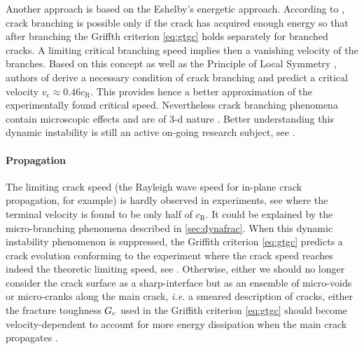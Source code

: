 \begin{itemize}
Another approach is based on the Eshelby's energetic approach. According to \cite{Eshelby:1970}, crack branching is possible only if the crack has acquired enough energy so that after branching the Griffth criterion \eqref{eq:gtgc} holds separately for branched cracks. A limiting critical branching speed implies then a vanishing velocity of the branches. Based on this concept as well as the Principle of Local Symmetry \cite{GolDstein:1974aa}, authors of \cite{KatzavAdda-BediaArias:2007} derive a necessary condition of crack branching and predict a critical velocity $v_\mathrm{c}\approx 0.46c_\mathrm{R}$. This provides hence a better approximation of the experimentally found critical speed. Nevertheless crack branching phenomena contain microscopic effects \cite{Ravi-ChandarKnauss:1984} and are of 3-d nature \cite{FinebergMarder:1999}. Better understanding this dynamic instability is still an active on-going research subject, see \cite{BouchbinderGoldmanFineberg:2014,FinebergBouchbinder:2015}.
\end{itemize}

\paragraph{Propagation} The limiting crack speed (the Rayleigh wave speed for in-plane crack propagation, for example) is hardly observed in experiments, see \cite{Ravi-ChandarKnauss:1984a} where the terminal velocity is found to be only half of $c_\mathrm{R}$. It could be explained by the micro-branching phenomena described in \cref{sec:dynafrac}. When this dynamic instability phenomenon is suppressed, the Griffith criterion \eqref{eq:gtgc} predicts a crack evolution conforming to the experiment where the crack speed reaches indeed the theoretic limiting speed, see \cite{SharonFineberg:1999,FinebergBouchbinder:2015}. Otherwise, either we should no longer consider the crack surface as a sharp-interface but as an ensemble of micro-voids or micro-cranks along the main crack, \emph{i.e.} a smeared description of cracks, either the fracture toughness $G_\mathrm{c}$ used in the Griffith criterion \eqref{eq:gtgc} should become velocity-dependent to account for more energy dissipation when the main crack propagates \cite{SharonGrossFineberg:1996}.

